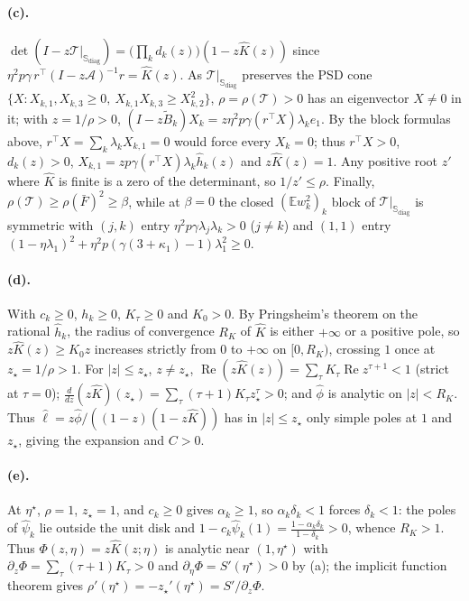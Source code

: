 \documentclass[11pt]{article}
\newcommand{\E}{\mathbb{E}}
\newcommand{\T}{\mathcal T}
\begin{document}
\paragraph{(c).} $\det(I-z\T|_{\mathbb S_{\mathrm{diag}}})=\big(\prod_kd_k(z)\big)(1-z\widehat K(z))$ since $\eta^2p\gamma\,r^\top(I-z\mathcal A)^{-1}r=\widehat K(z)$. As $\T|_{\mathbb S_{\mathrm{diag}}}$ preserves the PSD cone $\{X:X_{k,1},X_{k,3}\ge0,\ X_{k,1}X_{k,3}\ge X_{k,2}^2\}$, $\rho=\rho(\T)>0$ has an eigenvector $X\ne0$ in it; with $z=1/\rho>0$, $(I-z\widetilde B_k)X_k=z\eta^2p\gamma(r^\top X)\lambda_ke_1$. By the block formulas above, $r^\top X=\sum_k\lambda_kX_{k,1}=0$ would force every $X_k=0$; thus $r^\top X>0$, $d_k(z)>0$, $X_{k,1}=zp\gamma(r^\top X)\lambda_k\widehat h_k(z)$ and $z\widehat K(z)=1$. Any positive root $z'$ where $\widehat K$ is finite is a zero of the determinant, so $1/z'\le\rho$. Finally, $\rho(\T)\ge\rho(\bar F)^2\ge\beta$, while at $\beta=0$ the closed $(\E w_k^2)_k$ block of $\T|_{\mathbb S_{\mathrm{diag}}}$ is symmetric with $(j,k)$ entry $\eta^2p\gamma\lambda_j\lambda_k>0$ ($j\ne k$) and $(1,1)$ entry $(1-\eta\lambda_1)^2+\eta^2p(\gamma(3+\kappa_1)-1)\lambda_1^2\ge0$.

\paragraph{(d).} With $c_k\ge0$, $h_k\ge0$, $K_\tau\ge0$ and $K_0>0$. By Pringsheim's theorem on the rational $\widehat h_k$, the radius of convergence $R_K$ of $\widehat K$ is either $+\infty$ or a positive pole, so $z\widehat K(z)\ge K_0z$ increases strictly from $0$ to $+\infty$ on $[0,R_K)$, crossing $1$ once at $z_\star=1/\rho>1$. For $|z|\le z_\star$, $z\ne z_\star$, $\operatorname{Re}(z\widehat K(z))=\sum_\tau K_\tau\operatorname{Re}z^{\tau+1}<1$ (strict at $\tau=0$); $\frac{d}{dz}(z\widehat K)(z_\star)=\sum_\tau(\tau+1)K_\tau z_\star^\tau>0$; and $\widehat\phi$ is analytic on $|z|<R_K$. Thus $\widehat\ell=z\widehat\phi/((1-z)(1-z\widehat K))$ has in $|z|\le z_\star$ only simple poles at $1$ and $z_\star$, giving the expansion and $C>0$.

\paragraph{(e).} At $\eta^\star$, $\rho=1$, $z_\star=1$, and $c_k\ge0$ gives $\alpha_k\ge1$, so $\alpha_k\delta_k<1$ forces $\delta_k<1$: the poles of $\widehat\psi_k$ lie outside the unit disk and $1-c_k\widehat\psi_k(1)=\frac{1-\alpha_k\delta_k}{1-\delta_k}>0$, whence $R_K>1$. Thus $\Phi(z,\eta)=z\widehat K(z;\eta)$ is analytic near $(1,\eta^\star)$ with $\partial_z\Phi=\sum_\tau(\tau+1)K_\tau>0$ and $\partial_\eta\Phi=S'(\eta^\star)>0$ by (a); the implicit function theorem gives $\rho'(\eta^\star)=-z_\star'(\eta^\star)=S'/\partial_z\Phi$.
\end{document}
